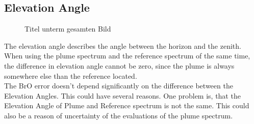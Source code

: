 \documentclass  [
  paper    = a4,
  BCOR     = 10mm,
  twoside,
  fontsize = 12pt,
  fleqn,
  toc      = bibnumbered,
  toc      = listofnumbered,
  numbers  = noendperiod,
  headings = normal,
  listof   = leveldown,
  version  = 3.03
]                                       {scrreprt}
\begin{document}
	\subsection{Elevation Angle}
		\begin{figure}[h!]			
		\caption{Titel unterm gesamten Bild}
	\end{figure}
	The elevation angle describes the angle between the horizon and the zenith. When using the plume spectrum and the reference spectrum of the same time, the difference in elevation angle cannot be zero, since the plume is always somewhere else than the reference located.\\
	The BrO error doesn't depend significantly on the difference between the Elevation Angles. This could have several reasons. One problem is, that the Elevation Angle of Plume and Reference spectrum is not the same. This could also be a reason of uncertainty of the evaluations of the plume spectrum.
\end{document}
